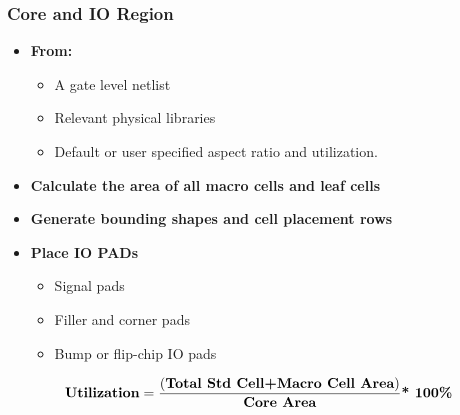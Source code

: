 \documentclass[compress]{beamer}
\begin{document}
\begin{frame}
	\frametitle{Core and IO Region}
	\begin{itemize}
		\item \textbf{From:}
			\begin{itemize}
				\item  A gate level netlist
				\item Relevant physical libraries
				\item Default or user specified aspect ratio and utilization.
			\end{itemize}
		\item \textbf{Calculate the area of all macro cells and leaf cells}
		\item \textbf{Generate bounding shapes and cell placement rows}
		\item \textbf{Place IO PADs}
			\begin{itemize}
				\item Signal pads
				\item Filler and corner pads
				\item Bump or flip-chip IO pads
			\end{itemize}
	\end{itemize}
	 \begin{equation}    %
		\textbf{Utilization} = \frac{(\textbf{Total Std Cell} \textbf{\textbf{+}} \textbf{Macro Cell Area})}{\textbf{Core Area}} \textbf{* 100\%}
	\end{equation}
\end{frame}
\end{document}
